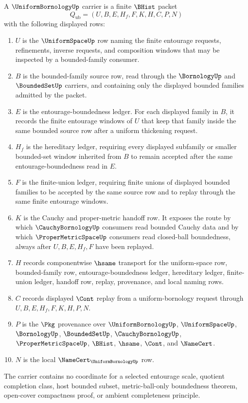 \begin{definition}
\label{def:uniform-bornology-carrier}
A $\UniformBornologyUp$ carrier is a finite $\BHist$ packet
$$
Q_{\mathrm{ub}}=(U,B,E,H_f,F,K,H,C,P,N)
$$
with the following displayed rows:
\begin{enumerate}
\item $U$ is the $\UniformSpaceUp$ row naming the finite entourage requests, refinements, inverse requests, and composition windows that may be inspected by a bounded-family consumer.
\item $B$ is the bounded-family source row, read through the $\BornologyUp$ and $\BoundedSetUp$ carriers, and containing only the displayed bounded families admitted by the packet.
\item $E$ is the entourage-boundedness ledger. For each displayed family in $B$, it records the finite entourage windows of $U$ that keep that family inside the same bounded source row after a uniform thickening request.
\item $H_f$ is the hereditary ledger, requiring every displayed subfamily or smaller bounded-set window inherited from $B$ to remain accepted after the same entourage-boundedness read in $E$.
\item $F$ is the finite-union ledger, requiring finite unions of displayed bounded families to be accepted by the same source row and to replay through the same finite entourage windows.
\item $K$ is the Cauchy and proper-metric handoff row. It exposes the route by which $\CauchyBornologyUp$ consumers read bounded Cauchy data and by which $\ProperMetricSpaceUp$ consumers read closed-ball boundedness, always after $U,B,E,H_f,F$ have been replayed.
\item $H$ records componentwise $\hsame$ transport for the uniform-space row, bounded-family row, entourage-boundedness ledger, hereditary ledger, finite-union ledger, handoff row, replay, provenance, and local naming rows.
\item $C$ records displayed $\Cont$ replay from a uniform-bornology request through $U,B,E,H_f,F,K,H,P,N$.
\item $P$ is the $\Pkg$ provenance over $\UniformBornologyUp$, $\UniformSpaceUp$, $\BornologyUp$, $\BoundedSetUp$, $\CauchyBornologyUp$, $\ProperMetricSpaceUp$, $\BHist$, $\hsame$, $\Cont$, and $\NameCert$.
\item $N$ is the local $\NameCert_{\UniformBornologyUp}$ row.
\end{enumerate}
The carrier contains no coordinate for a selected entourage scale, quotient completion class, host bounded subset, metric-ball-only boundedness theorem, open-cover compactness proof, or ambient completeness principle.
\end{definition}

